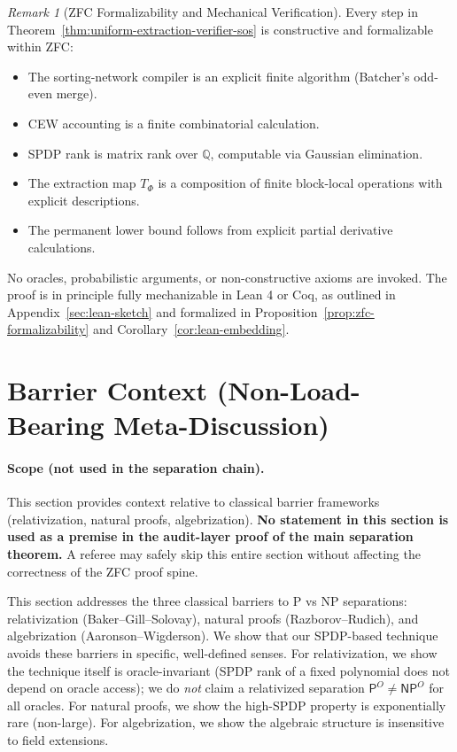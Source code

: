 \documentclass[12pt]{article}
\theoremstyle{definition}
\theoremstyle{definition}
\theoremstyle{remark}
\newtheorem{remark}{Remark}
\theoremstyle{remark}
\begin{document}
\begin{remark}[ZFC Formalizability and Mechanical Verification]
Every step in Theorem~\ref{thm:uniform-extraction-verifier-sos} is constructive and formalizable within ZFC:
\begin{itemize}
\item The sorting-network compiler is an explicit finite algorithm (Batcher's odd-even merge).
\item CEW accounting is a finite combinatorial calculation.
\item SPDP rank is matrix rank over $\mathbb{Q}$, computable via Gaussian elimination.
\item The extraction map $T_\Phi$ is a composition of finite block-local operations with explicit descriptions.
\item The permanent lower bound follows from explicit partial derivative calculations.
\end{itemize}
No oracles, probabilistic arguments, or non-constructive axioms are invoked. The proof is in principle fully mechanizable in Lean 4 or Coq, as outlined in Appendix~\ref{sec:lean-sketch} and formalized in Proposition~\ref{prop:zfc-formalizability} and Corollary~\ref{cor:lean-embedding}.
\end{remark}


\section{Barrier Context (Non-Load-Bearing Meta-Discussion)}
\label{sec:barrier-analysis}

\paragraph{Scope (not used in the separation chain).}
This section provides context relative to classical barrier frameworks
(relativization, natural proofs, algebrization).
\textbf{No statement in this section is used as a premise in the audit-layer proof of the main
separation theorem.} A referee may safely skip this entire section without affecting
the correctness of the ZFC proof spine.

\medskip

This section addresses the three classical barriers to P vs NP separations: relativization (Baker--Gill--Solovay), natural proofs (Razborov--Rudich), and algebrization (Aaronson--Wigderson). We show that our SPDP-based technique avoids these barriers in specific, well-defined senses. For relativization, we show the technique itself is oracle-invariant (SPDP rank of a fixed polynomial does not depend on oracle access); we do \emph{not} claim a relativized separation $\mathsf{P}^O \neq \mathsf{NP}^O$ for all oracles. For natural proofs, we show the high-SPDP property is exponentially rare (non-large). For algebrization, we show the algebraic structure is insensitive to field extensions.
\end{document}
